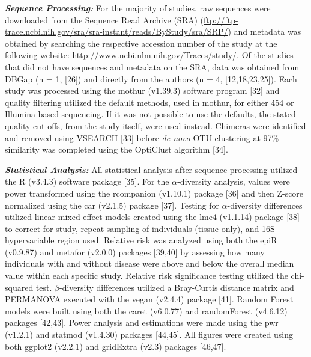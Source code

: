 \documentclass[12pt,]{article}
\begin{document}
\textbf{\emph{Sequence Processing:}} For the majority of studies, raw
sequences were downloaded from the Sequence Read Archive (SRA)
(\url{ftp://ftp-trace.ncbi.nih.gov/sra/sra-instant/reads/ByStudy/sra/SRP/})
and metadata was obtained by searching the respective accession number
of the study at the following website:
\url{http://www.ncbi.nlm.nih.gov/Traces/study/}. Of the studies that did
not have sequences and metadata on the SRA, data was obtained from DBGap
(n = 1, {[}26{]}) and directly from the authors (n = 4,
{[}12,18,23,25{]}). Each study was processed using the mothur (v1.39.3)
software program {[}32{]} and quality filtering utilized the default
methods, used in mothur, for either 454 or Illumina based sequencing. If
it was not possible to use the defaults, the stated quality cut-offs,
from the study itself, were used instead. Chimeras were identified and
removed using VSEARCH {[}33{]} before \emph{de novo} OTU clustering at
97\% similarity was completed using the OptiClust algorithm {[}34{]}.

\textbf{\emph{Statistical Analysis:}} All statistical analysis after
sequence processing utilized the R (v3.4.3) software package {[}35{]}.
For the \(\alpha\)-diversity analysis, values were power transformed
using the rcompanion (v1.10.1) package {[}36{]} and then Z-score
normalized using the car (v2.1.5) package {[}37{]}. Testing for
\(\alpha\)-diversity differences utilized linear mixed-effect models
created using the lme4 (v1.1.14) package {[}38{]} to correct for study,
repeat sampling of individuals (tissue only), and 16S hypervariable
region used. Relative risk was analyzed using both the epiR (v0.9.87)
and metafor (v2.0.0) packages {[}39,40{]} by assessing how many
individuals with and without disease were above and below the overall
median value within each specific study. Relative risk significance
testing utilized the chi-squared test. \(\beta\)-diversity differences
utilized a Bray-Curtis distance matrix and PERMANOVA executed with the
vegan (v2.4.4) package {[}41{]}. Random Forest models were built using
both the caret (v6.0.77) and randomForest (v4.6.12) packages
{[}42,43{]}. Power analysis and estimations were made using the pwr
(v1.2.1) and statmod (v1.4.30) packages {[}44,45{]}. All figures were
created using both ggplot2 (v2.2.1) and gridExtra (v2.3) packages
{[}46,47{]}.
\end{document}
